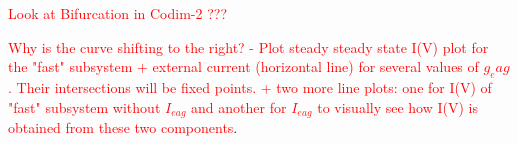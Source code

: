 \documentclass[../main.tex]{subfiles}
\begin{document}
\textcolor{red}{Look at Bifurcation in Codim-2 ???}

\textcolor{red}{Why is the curve shifting to the right? - Plot steady steady state I(V) plot for the "fast" subsystem + external current (horizontal line) for several values of $g_eag$. Their intersections will be fixed points. + two more line plots: one for I(V) of "fast" subsystem without $I_{eag}$ and another for $I_{eag}$ to visually see how I(V) is obtained from these two components}.
\end{document}
